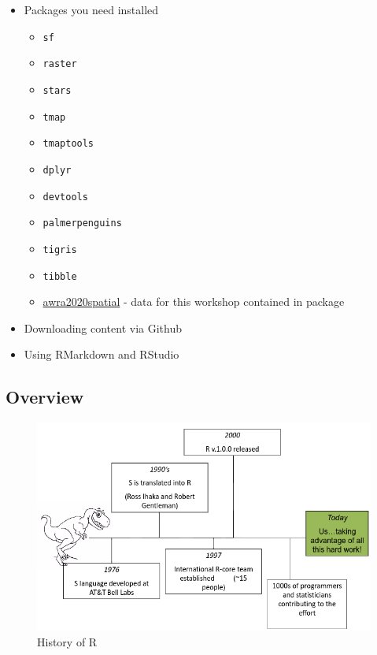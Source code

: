 \documentclass[
]{book}
\providecommand{\tightlist}{%
  \setlength{\itemsep}{0pt}\setlength{\parskip}{0pt}}
\begin{document}
\begin{itemize}
\item
  Packages you need installed

  \begin{itemize}
  \tightlist
  \item
    \texttt{sf}
  \item
    \texttt{raster}
  \item
    \texttt{stars}
  \item
    \texttt{tmap}
  \item
    \texttt{tmaptools}
  \item
    \texttt{dplyr}
  \item
    \texttt{devtools}
  \item
    \texttt{palmerpenguins}
  \item
    \texttt{tigris}
  \item
    \texttt{tibble}
  \item
    \href{https://github.com/mhweber/awra2020spatial}{awra2020spatial} - data for this workshop contained in package
  \end{itemize}
\item
  Downloading content via Github
\item
  Using RMarkdown and RStudio
\end{itemize}

\hypertarget{overview}{%
\subsection{Overview}\label{overview}}

\begin{figure}
\includegraphics[width=1.5\linewidth]{images/History of R} \caption{History of R}\label{fig:unnamed-chunk-2}
\end{figure}
\end{document}
